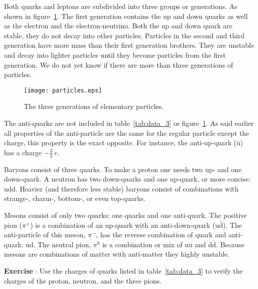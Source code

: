 \vspace{0.5cm}

Both quarks and leptons are subdivided into three groups or generations. As shown in figure~\ref{fig:particles}. The first generation contains the up and down quarks as well as the electron and the electron-neutrino. Both the up and down quark are stable, they do not decay into other particles. Particles in the second and third generation have more mass than their first generation brothers. They are unstable and decay into lighter particles until they become particles from the first generation. We do not yet know if there are more than three generations of particles.

\begin{figure}[h]\begin{center}
\texttt{[image: particles.eps]}%
\caption{The three generations of elementary particles.\protect\footnotemark}\label{fig:particles}
\end{center}\end{figure}

The anti-quarks are not included in table~\ref{tab:data_3} or figure~\ref{fig:particles}. As said earlier all properties of the anti-particle are the same for the regular particle except the charge, this property is the exact opposite. For instance, the anti-up-quark ($\overline{\mbox{u}}$) has a charge $-\frac{2}{3}~e$.

Baryons consist of three quarks. To make a proton one needs two up- and one down-quark. A neutron has two down-quarks and one up-quark, or more concise: udd. Heavier (and therefore less stable) baryons consist of combinations with strange-, charm-, bottom-, or even top-quarks.

Mesons consist of only two quarks: one quarks and one anti-quark. The positive pion ($\pi^+$) is a combination of an up-quark with an anti-down-quark (u$\overline{\mbox{d}}$). The anti-particle of this meson, $\pi^-$, has the reverse combination of quark and anti-quark: $\overline{\mbox{u}}$d. The neutral pion, $\pi^0$ is a combination or mix of u$\overline{\mbox{u}}$ and d$\overline{\mbox{d}}$. Because mesons are combinations of matter with anti-matter they highly unstable. 

\begin{shaded}
\textbf{Exercise \theExercise {}} : Use the charges of quarks listed in table~\ref{tab:data_3} to verify the charges of the proton, neutron, and the three pions.\end{shaded}

